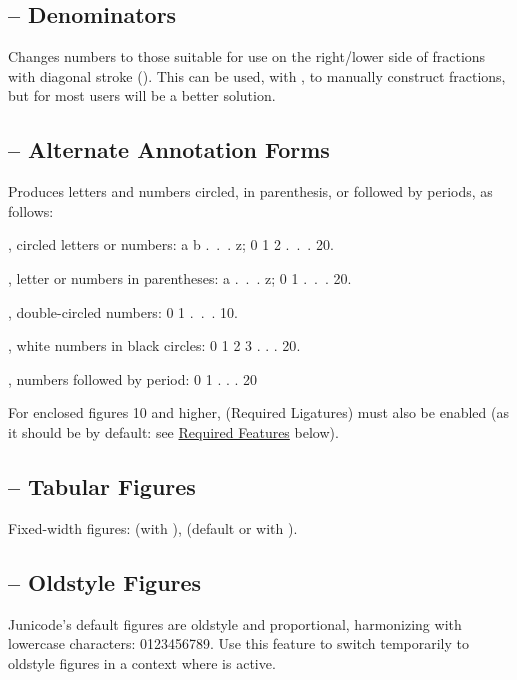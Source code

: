 \subsection{ – Denominators}
Changes numbers to those suitable for use on the right/lower side of fractions
with diagonal stroke (). This can be used, with , to manually construct
fractions, but for most users  will be a better solution.

\subsection{ – Alternate Annotation Forms}
Produces letters and numbers circled, in parenthesis, or followed by periods, as follows:

, circled letters or numbers: {a b .~.~. z; 0 1 2 .~.~. 20}.

, letter or numbers in parentheses: {a .~.~. z; 0 1 .~.~. 20}.

, double-circled numbers: {0 1 .~.~. 10}.

, white numbers in black circles: {0 1 2 3 . . . 20}.

, numbers followed by period: {0 1 . . . 20}

\noindent For enclosed figures 10 and higher, 
(Required Ligatures) must also be enabled (as it should
be by default: see \hyperlink{req}{Required Features} below).

\subsection{ – Tabular Figures}
Fixed-width figures:  (with ),  (default or with
).

\subsection{ – Oldstyle Figures}
Junicode's default figures are oldstyle and proportional, harmonizing with lowercase characters:
0123456789. Use this feature to switch temporarily to oldstyle figures in a context where
 is active.

